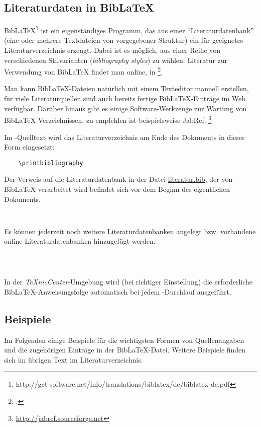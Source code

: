 \subsection{Literaturdaten in BibLaTeX}
\label{sec:bibtex}

BibLaTeX\footnote{http://get-software.net/info/translations/biblatex/de/biblatex-de.pdf} ist ein eigenständiges Programm, das aus einer "`Literaturdatenbank"' (eine oder mehrere
Textdateien von vorgegebener Struktur) ein für \latex geeignetes Literaturverzeichnis
erzeugt. Dabei ist es möglich, aus einer Reihe von verschiedenen Stilvarianten
(\emph{bibliography styles}) zu wählen.
Literatur zur Verwendung von BibLaTeX findet man online, \zB in
\footcite{Taylor96,Patashnik88}.

Man kann BibLaTeX-Dateien natürlich mit einem Texteditor manuell erstellen, für
viele Literaturquellen sind auch bereits fertige BibLaTeX-Einträge im Web verfügbar.
Darüber hinaus gibt es einige Software-Werkzeuge zur Wartung von
BibLaTeX-Verzeichnissen, zu empfehlen ist beispielsweise
JabRef.%
\footnote{\url{http://jabref.sourceforge.net}}
 
Im \latex-Quelltext wird das Literaturverzeichnis am Ende des
Dokuments in dieser Form eingesetzt:
%
\begin{verbatim}
    \printbibliography
\end{verbatim}
%
Der Verweis auf die Literaturdatenbank in der Datei
\url{literatur.bib}, der von BibLaTeX verarbeitet wird befindet sich vor dem Beginn des eigentlichen Dokuments.
%
\begin{verbatim}
    
\end{verbatim}
%
Es können jederzeit noch weitere Literaturdatenbanken angelegt bzw. vorhandene online Literaturdatenbanken hinzugefügt werden. 
%
\begin{verbatim}
    
    
\end{verbatim}
%
In der \emph{TeXnicCenter}-Umgebung wird (bei richtiger Einstellung) die
erforderliche BibLaTeX-Anweisungsfolge automatisch bei jedem \latex-Durchlauf
ausgeführt.




\subsection{Beispiele}
Im Folgenden einige Beispiele für die wichtigsten Formen von Quellenangaben
und die zugehörigen Einträge in der BibLaTeX-Datei.
Weitere Beispiele finden sich im übrigen Text \bzw im
Literaturverzeichnis.

